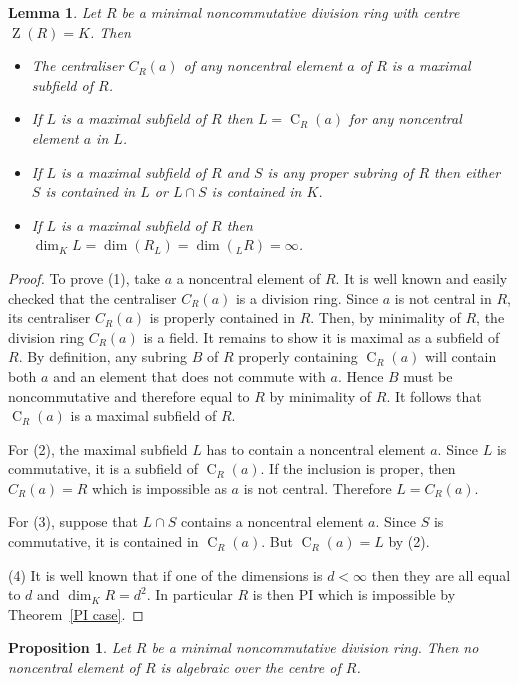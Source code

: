 \documentclass[11pt]{article}
\DeclareMathOperator{\Z}{Z}
\DeclareMathOperator{\C}{C}
\newtheorem{lemma}[corollary]{Lemma}
\newtheorem{proposition}[corollary]{Proposition}
\theoremstyle{definition}
\begin{document}
\begin{lemma}\label{MaximalSubfields}
Let $R$ be a minimal noncommutative division ring with centre $\Z(R)=K$. Then
\begin{itemize}[topsep=0pt]
\item[(1)] The centraliser $C_R(a)$ of any noncentral element $a$ of $R$ is a maximal subfield of $R$.
\item[(2)] If $L$ is a maximal subfield of $R$ then $L=\C_R(a)$ for any noncentral element $a$ in $L$.
\item[(3)] If $L$ is a maximal subfield of $R$ and $S$ is any proper subring of $R$ then either $S$ is contained in $L$ or $L\cap S$ is contained in $K$.
\item[(4)] If $L$ is a maximal subfield of $R$ then $\dim_K L=\dim\left(R_L\right)=\dim\left({}_{L}R\right)=\infty$.
\end{itemize}
\end{lemma}

\begin{proof}
To prove (1), take $a$ a noncentral element of $R$. It is well known and easily checked that the centraliser $C_R(a)$ is a division ring. Since $a$ is not central in $R$, its centraliser $C_R(a)$ is properly contained in $R$. Then, by minimality of $R$, the division ring $C_R(a)$ is a field. It remains to show it is maximal as a subfield of $R$. By definition, any subring $B$ of $R$ properly containing $\C_R(a)$ will contain both $a$ and an element that does not commute with $a$. Hence $B$ must be noncommutative and therefore equal to $R$ by minimality of $R$. It follows that $\C_R(a)$ is a maximal subfield of $R$.

For (2), the maximal subfield $L$ has to contain a noncentral element $a$. Since $L$ is commutative, it is a subfield of $\C_R(a)$. If the inclusion is proper, then $C_R(a)=R$ which is impossible as $a$ is not central. Therefore $L=C_R(a)$.

For (3), suppose that $L\cap S$ contains a noncentral element $a$. Since $S$ is commutative, it is contained in $\C_R(a)$. But $\C_R(a)=L$ by (2).

(4) It is well known that if one of the dimensions is $d<\infty$ then they are all equal to $d$ and $\dim_K R=d^2$. In particular $R$ is then PI which is impossible by Theorem~\ref{PI case}.
\end{proof}

\begin{proposition}\label{AlgebraicIsCentral}
Let $R$ be a minimal noncommutative division ring. Then no noncentral element of $R$ is algebraic over the centre of $R$.
\end{proposition}
\end{document}
